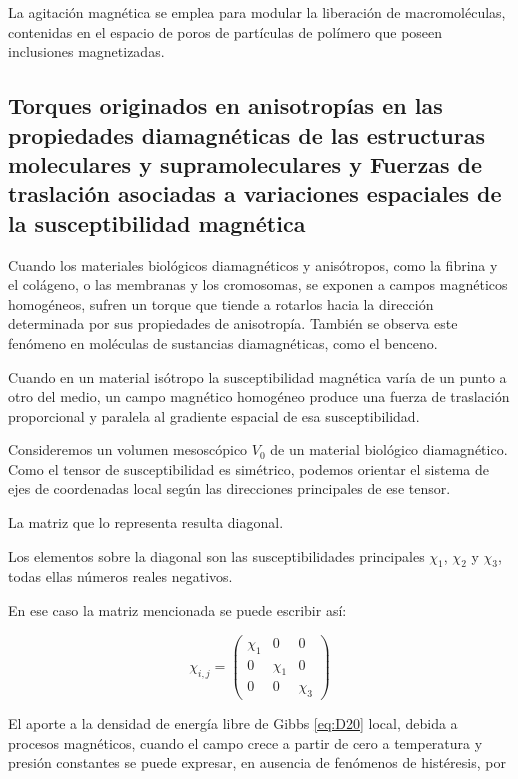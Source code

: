 La agitación magnética se emplea para modular la liberación de macromoléculas, contenidas en el espacio de poros de partículas de polímero que poseen inclusiones magnetizadas.

\subsection{Torques originados en anisotropías en las propiedades diamagnéticas de las estructuras moleculares y supramoleculares y Fuerzas de traslación asociadas a variaciones espaciales de la susceptibilidad magnética}


Cuando los materiales biológicos diamagnéticos y anisótropos, como la fibrina y el colágeno, o las membranas y los cromosomas, se exponen a campos magnéticos homogéneos, sufren un torque que tiende a rotarlos hacia la dirección determinada por sus propiedades de anisotropía. También se observa este fenómeno en moléculas de sustancias diamagnéticas, como el benceno.

Cuando en un material isótropo la susceptibilidad magnética varía de un punto a otro del medio, un campo magnético homogéneo produce una fuerza de traslación proporcional y paralela al gradiente espacial de esa susceptibilidad.

Consideremos un volumen mesoscópico $V_{0}$ de un material biológico diamagnético.
Como el tensor de susceptibilidad es simétrico, podemos orientar el sistema de ejes de coordenadas local según las direcciones principales de ese tensor.

La matriz que lo representa resulta diagonal.

Los elementos sobre la diagonal son las susceptibilidades principales $\chi_{1}$, $\chi_{2}$ y $\chi_{3}$, todas ellas números reales negativos.

En ese caso la matriz mencionada se puede escribir así: 

\begin{equation}
	\label{eq:611}
	\chi_{i,j} = 
	\begin{pmatrix}
	\chi_{1}  & 0       & 0       \\
	0         &\chi_{1} & 0       \\
	0         & 0       & \chi_{3} 
	\end{pmatrix}
\end{equation}

El aporte a la densidad de energía libre de Gibbs \ref{eq:D20} local, debida a procesos magnéticos, cuando el campo crece a partir de cero a temperatura y presión constantes se puede expresar, en ausencia de fenómenos de histéresis, por


